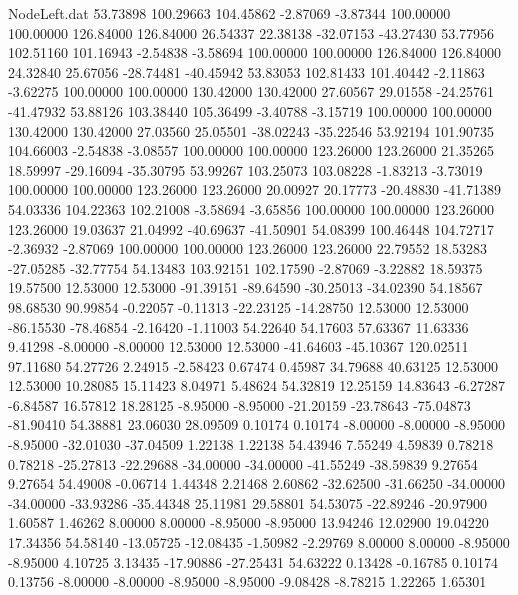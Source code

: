 \begin{filecontents}{NodeLeft.dat}
  53.73898  100.29663  104.45862    -2.87069   -3.87344  100.00000  100.00000  126.84000  126.84000   26.54337   22.38138  -32.07153  -43.27430
  53.77956  102.51160  101.16943    -2.54838   -3.58694  100.00000  100.00000  126.84000  126.84000   24.32840   25.67056  -28.74481  -40.45942
  53.83053  102.81433  101.40442    -2.11863   -3.62275  100.00000  100.00000  130.42000  130.42000   27.60567   29.01558  -24.25761  -41.47932
  53.88126  103.38440  105.36499    -3.40788   -3.15719  100.00000  100.00000  130.42000  130.42000   27.03560   25.05501  -38.02243  -35.22546
  53.92194  101.90735  104.66003    -2.54838   -3.08557  100.00000  100.00000  123.26000  123.26000   21.35265   18.59997  -29.16094  -35.30795
  53.99267  103.25073  103.08228    -1.83213   -3.73019  100.00000  100.00000  123.26000  123.26000   20.00927   20.17773  -20.48830  -41.71389
  54.03336  104.22363  102.21008    -3.58694   -3.65856  100.00000  100.00000  123.26000  123.26000   19.03637   21.04992  -40.69637  -41.50901
  54.08399  100.46448  104.72717    -2.36932   -2.87069  100.00000  100.00000  123.26000  123.26000   22.79552   18.53283  -27.05285  -32.77754
  54.13483  103.92151  102.17590    -2.87069   -3.22882   18.59375   19.57500   12.53000   12.53000  -91.39151  -89.64590  -30.25013  -34.02390
  54.18567   98.68530   90.99854    -0.22057   -0.11313  -22.23125  -14.28750   12.53000   12.53000  -86.15530  -78.46854   -2.16420   -1.11003
  54.22640   54.17603   57.63367    11.63336    9.41298   -8.00000   -8.00000   12.53000   12.53000  -41.64603  -45.10367  120.02511   97.11680
  54.27726    2.24915   -2.58423     0.67474    0.45987   34.79688   40.63125   12.53000   12.53000   10.28085   15.11423    8.04971    5.48624
  54.32819   12.25159   14.83643    -6.27287   -6.84587   16.57812   18.28125   -8.95000   -8.95000  -21.20159  -23.78643  -75.04873  -81.90410
  54.38881   23.06030   28.09509     0.10174    0.10174   -8.00000   -8.00000   -8.95000   -8.95000  -32.01030  -37.04509    1.22138    1.22138
  54.43946    7.55249    4.59839     0.78218    0.78218  -25.27813  -22.29688  -34.00000  -34.00000  -41.55249  -38.59839    9.27654    9.27654
  54.49008   -0.06714    1.44348     2.21468    2.60862  -32.62500  -31.66250  -34.00000  -34.00000  -33.93286  -35.44348   25.11981   29.58801
  54.53075  -22.89246  -20.97900     1.60587    1.46262    8.00000    8.00000   -8.95000   -8.95000   13.94246   12.02900   19.04220   17.34356
  54.58140  -13.05725  -12.08435    -1.50982   -2.29769    8.00000    8.00000   -8.95000   -8.95000    4.10725    3.13435  -17.90886  -27.25431
  54.63222    0.13428   -0.16785     0.10174    0.13756   -8.00000   -8.00000   -8.95000   -8.95000   -9.08428   -8.78215    1.22265    1.65301

\end{filecontents}
